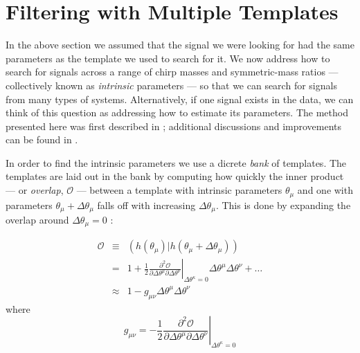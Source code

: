 \section{Filtering with Multiple Templates}
\label{sec:multiple_templates}
In the above section we assumed that the signal we were looking for had the same parameters as the template we used to search for it. We now address how to search for signals across a range of chirp masses and symmetric-mass ratios --- collectively known as \emph{intrinsic} parameters --- so that we can search for signals from many types of systems. Alternatively, if one signal exists in the data, we can think of this question as addressing how to estimate its parameters. The method presented here was first described in \cite{Owen:1995tm}; additional discussions and improvements can be found in \cite{Owen:1998dk, Tanaka:2000, BBCCS:2006, hexabank}.

In order to find the intrinsic parameters we use a dicrete \emph{bank} of templates. The templates are laid out in the bank by computing how quickly the inner product --- or \emph{overlap}, $\mathcal{O}$ --- between a template with intrinsic parameters $\theta_\mu$ and one with parameters $\theta_\mu + \Delta\theta_\mu$ falls off with increasing $\Delta\theta_\mu$. This is done by expanding the overlap around $\Delta\theta_\mu = 0$ \cite{Owen:1995tm, Owen:1998dk, BBCCS:2006}:

\begin{eqnarray}
\label{eqn:OverlapSeries}
\mathcal{O} & \equiv & \left( h(\theta_\mu) | h(\theta_\mu + \Delta\theta_\mu) \right)  \\
        & = & 1 + \frac{1}{2} \left.\frac{\partial^2\mathcal{O}}{\partial \Delta\theta^\mu \partial \Delta\theta^\nu} \right|_{\Delta\theta^\kappa = 0} \Delta\theta^\mu \Delta\theta^\nu + \ldots \nonumber \\
        & \approx & 1 - g_{\mu \nu}\Delta\theta^\mu\Delta\theta^\nu
\end{eqnarray}
where 
\begin{equation}
\label{eqn:templateMetric}
g_{\mu \nu} = -\frac{1}{2} \left.\frac{\partial^2\mathcal{O}}{\partial \Delta\theta^\mu \partial \Delta\theta^\nu} \right|_{\Delta\theta^\kappa = 0}
\end{equation}

